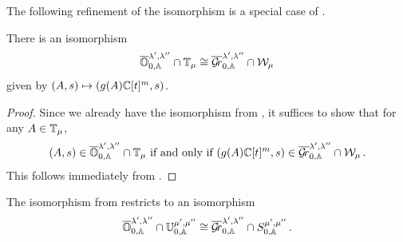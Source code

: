 \documentclass[draft]{article} %
\begin{document}
The following refinement of the \mvy isomorphism is a special case of \cite[Theorem 5.3]{mirkovic2007quiver}. 
\begin{theorem} 
\label{th:OGrl}
There is an isomorphism
$$
    \overline{\mathbb O}^{\lambda', \lambda''}_{0,\mathbb A} \cap \mathbb T_\mu \cong \overline{\mathcal{G}\!r}^{\lambda', \lambda''}_{0,\mathbb A} \cap \mathcal W_\mu 
$$
given by $ (A,s) \mapsto (g(A)\mathbb C[t]^m, s)$.
\end{theorem}
\begin{proof}
Since we already have the isomorphism from , it suffices to show that for any $ A \in \mathbb T_\mu$, 
$$ 
    (A,s) \in \overline{\mathbb O}^{\lambda', \lambda''}_{0,\mathbb A} \cap \mathbb T_\mu \text{ if and only if } (g(A)\mathbb C[t]^m, s) \in \overline{\mathcal{G}\!r}^{\lambda', \lambda''}_{0,\mathbb A} \cap \mathcal W_\mu \,. 
$$
This follows immediately from .
\end{proof}
%
% 
% 
\begin{theorem}
\label{th:OTGrW}
The isomorphism from  
restricts to an isomorphism
$$ 
    \overline{\mathbb O}^{\lambda', \lambda''}_{0,\mathbb A} \cap \mathbb U^{\mu', \mu''}_{0,\mathbb A} \cong \overline{\mathcal{G}\!r}^{\lambda', \lambda''}_{0,\mathbb A} \cap S^{\mu', \mu''}_{0,\mathbb A}\,.
$$
\end{theorem}
% 
\end{document}
